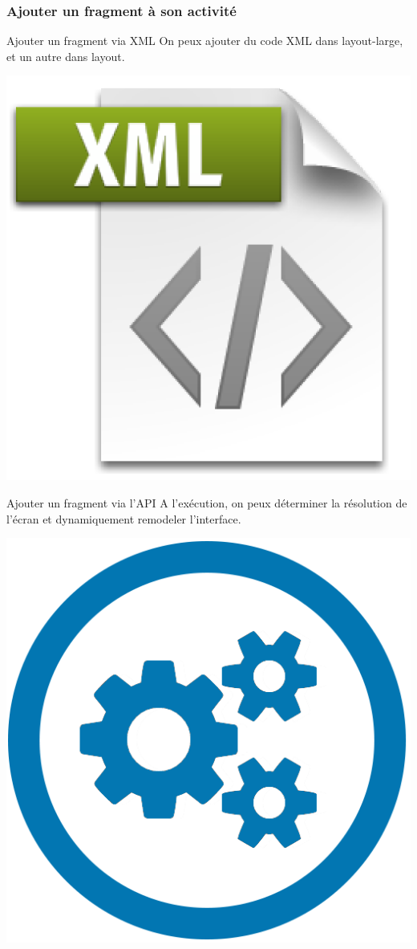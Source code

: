 \documentclass{beamer}
\begin{document}
\begin{frame}
\frametitle{Ajouter un fragment à son activité}
\begin{block}{Ajouter un fragment via XML}
On peux ajouter du code XML dans layout-large, et un autre dans layout.
\end{block}
\begin{center}
\includegraphics[scale=0.05]{xml-file.png}
\end{center}
\begin{block}{Ajouter un fragment via l'API}
A l’exécution, on peux déterminer la résolution de l’écran et dynamiquement remodeler l'interface.
\end{block}
\begin{center}
\includegraphics[scale=0.05]{api.png}
\end{center}
\end{frame}
\end{document}
